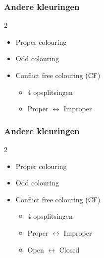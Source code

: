\documentclass
[kulak] %
{kulakbeamer}
\begin{document}
	\begin{frame}
		\frametitle{Andere kleuringen}
		
		
		\begin{multicols}{2}
			
			\begin{itemize}
				\item Proper colouring
				\item Odd colouring
				\item Conflict free colouring (CF)
				\pause
				\begin{itemize}
					\item 4 opsplitsingen
					\item Proper $\longleftrightarrow$ Improper
				\end{itemize}
			\end{itemize}
			
			\vspace*{\fill}\null

			\begin{center}
				\scalebox{.75}{}
			\end{center}
			
			\vspace*{\fill}\null
			
			
		\end{multicols}
		
		
	\end{frame}
	
	\begin{frame}
		\frametitle{Andere kleuringen}
		
		
		\begin{multicols}{2}
			
			\begin{itemize}
				\item Proper colouring
				\item Odd colouring
				\item Conflict free colouring (CF)
				\begin{itemize}
					\item 4 opsplitsingen
					\item Proper $\longleftrightarrow$ Improper
					\item Open $\longleftrightarrow$ Closed
				\end{itemize}
			\end{itemize}
			
			\vspace*{\fill}\null
			
			\begin{center}
				\scalebox{.75}{}
			\end{center}
			
			\vspace*{\fill}\null
			
			
		\end{multicols}
		
		
	\end{frame}
	
\end{document}
